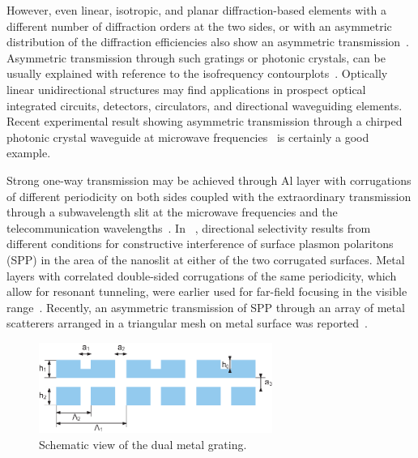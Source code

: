 \documentclass[10pt,letterpaper,twocolumn]{article} %
\begin{document}
However, even linear, isotropic, and planar diffraction-based elements with a different number of diffraction orders at the two sides, or with an asymmetric distribution of the diffraction efficiencies also show an asymmetric transmission~\cite{2,3}. Asymmetric transmission through such gratings or photonic crystals, can be usually explained with reference to the isofrequency contourplots~\cite{4}. Optically linear unidirectional structures may find applications in  prospect optical integrated circuits, detectors, circulators, and directional waveguiding elements.  Recent experimental result showing asymmetric transmission  through a  chirped photonic crystal waveguide at microwave frequencies~\cite{5} is certainly a good example.


Strong one-way transmission may be achieved through Al layer with corrugations of different periodicity on both sides coupled with the extraordinary transmission through a subwavelength slit at the microwave frequencies and the telecommunication wavelengths~\cite{6,7,8}. 
In ~\cite{8},  directional selectivity results from different conditions for constructive interference of surface plasmon polaritons (SPP) in the area of the nanoslit  at either of the two corrugated surfaces. Metal layers with correlated double-sided corrugations of the same periodicity, which allow for resonant tunneling, were earlier used for far-field focusing in the visible range~\cite{9,10}. 
Recently, an asymmetric transmission of SPP through an array of metal scatterers arranged in a triangular mesh on metal surface was reported~\cite{11}.

\begin{figure}[htb]
 \begin{center}
 \includegraphics[width=3in]{fig1.eps}
 \end{center}
\caption{Schematic view of the dual metal grating.\label{fig.schem}}
\end{figure}
\end{document}
